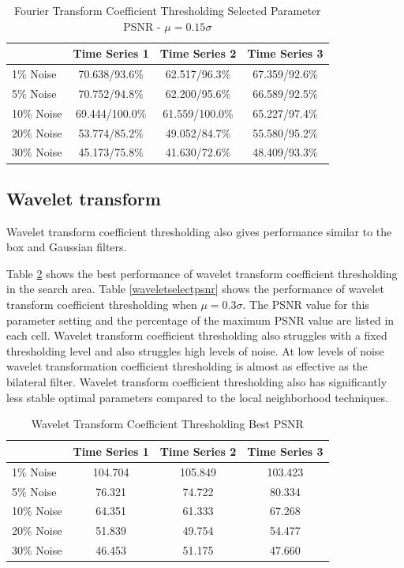 \documentclass[11pt]{article}
\theoremstyle{definition}
\begin{document}
\begin{table}[!h]
\small
\begin{center}
\begin{tabular}{lccc}
\hline 
 & Time Series 1 & Time Series 2 & Time Series 3 \\ \hline
1\% Noise & 70.638/93.6\% & 62.517/96.3\% & 67.359/92.6\% \\ \hline
5\% Noise & 70.752/94.8\% & 62.200/95.6\% & 66.589/92.5\% \\ \hline
10\% Noise & 69.444/100.0\% & 61.559/100.0\% & 65.227/97.4\% \\ \hline
20\% Noise & 53.774/85.2\% & 49.052/84.7\% & 55.580/95.2\% \\ \hline
30\% Noise & 45.173/75.8\% & 41.630/72.6\% & 48.409/93.3\% \\ \hline
\end{tabular}
\caption{Fourier Transform Coefficient Thresholding Selected Parameter PSNR - $\mu = 0.15 \sigma$}
\label{fftselectpsnr}
\end{center}
\end{table}

\subsection{Wavelet transform} 
Wavelet transform coefficient thresholding also gives performance
similar to the box and Gaussian filters.

Table \ref{waveletbestpsnr} shows the best performance of wavelet
transform coefficient thresholding in the search area. Table
\ref{waveletselectpsnr} shows the performance of wavelet transform
coefficient thresholding when $\mu = 0.3 \sigma$. The PSNR value for
this parameter setting and the percentage of the maximum PSNR value
are listed in each cell. Wavelet transform coefficient thresholding
also struggles with a fixed thresholding level and also struggles high
levels of noise. At low levels of noise wavelet transformation
coefficient thresholding is almost as effective as the bilateral
filter. Wavelet transform coefficient thresholding also has
significantly less stable optimal parameters compared to the local
neighborhood techniques.

\begin{table}[!h]
\small
\begin{center}
\begin{tabular}{lccc}
\hline 
 & Time Series 1 & Time Series 2 & Time Series 3 \\ \hline
1\% Noise & 104.704 & 105.849 & 103.423 \\ \hline
5\% Noise & 76.321 & 74.722 & 80.334 \\ \hline
10\% Noise & 64.351 & 61.333 & 67.268 \\ \hline
20\% Noise & 51.839 & 49.754 & 54.477 \\ \hline
30\% Noise & 46.453 & 51.175 & 47.660 \\ \hline
\end{tabular}
\caption{Wavelet Transform Coefficient Thresholding Best PSNR}
\label{waveletbestpsnr}
\end{center}
\end{table}
\end{document}
